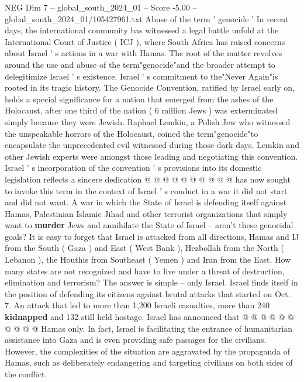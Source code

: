 \begin{textsample}{NEG Dim 7 – global\_south\_2024\_01 – Score -5.00 – global\_south\_2024\_01/105427961.txt}  \label{ex:f7_neg_405}
Abuse of the term ' genocide ' In recent days, the international community has witnessed a legal battle unfold at the International Court of Justice ( ICJ ), where South Africa has raised concerns about Israel ' s actions in a war with Hamas.
The root of the matter revolves around the use and abuse of the term"genocide"and the broader attempt to delegitimize Israel ' s existence.
Israel ' s commitment to the"Never Again"is rooted in its tragic history.
The Genocide Convention, ratified by Israel early on, holds a special significance for a nation that emerged from the ashes of the Holocaust, after one third of the nation ( 6 million Jews ) was exterminated simply because they were Jewish.
Raphael Lemkin, a Polish Jew who witnessed the unspeakable horrors of the Holocaust, coined the term"genocide"to encapsulate the unprecedented evil witnessed during those dark days.
Lemkin and other Jewish experts were amongst those leading and negotiating this convention.
Israel ' s incorporation of the convention ' s provisions into its domestic legislation reflects a sincere dedication @ @ @ @ @ @ @ @ @ @ has now sought to invoke this term in the context of Israel ' s conduct in a war it did not start and did not want.
A war in which the State of Israel is defending itself against Hamas, Palestinian Islamic Jihad and other terrorist organizations that simply want to \textbf{murder} Jews and annihilate the State of Israel -- aren't these genocidal goals?
It is easy to forget that Israel is attacked from all directions, Hamas and IJ from the South ( Gaza ) and East ( West Bank ), Hezbollah from the North ( Lebanon ), the Houthis from Southeast ( Yemen ) and Iran from the East.
How many states are not recognized and have to live under a threat of destruction, elimination and terrorism?
The answer is simple -- only Israel.
Israel finds itself in the position of defending its citizens against brutal attacks that started on Oct. 7.
An attack that led to more than 1,200 Israeli casualties, more than 240 \textbf{kidnapped} and 132 still held hostage.
Israel has announced that @ @ @ @ @ @ @ @ @ @ Hamas only.
In fact, Israel is facilitating the entrance of humanitarian assistance into Gaza and is even providing safe passages for the civilians.
However, the complexities of the situation are aggravated by the propaganda of Hamas, such as deliberately endangering and targeting civilians on both sides of the conflict.

\end{textsample}
